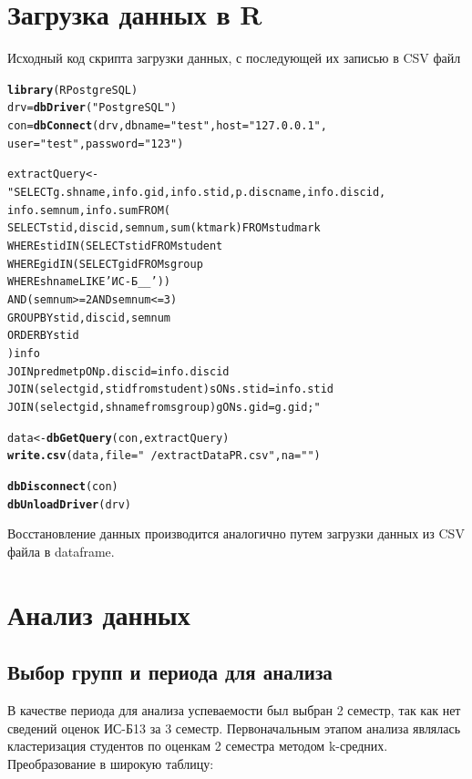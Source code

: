 \documentclass[12pt]{article}\usepackage[]{graphicx}\usepackage[]{color}
\makeatletter
\newcommand{\hlstr}[1]{\textcolor[rgb]{0.192,0.494,0.8}{#1}}%
\newcommand{\hlstd}[1]{\textcolor[rgb]{0.345,0.345,0.345}{#1}}%
\newcommand{\hlkwb}[1]{\textcolor[rgb]{0.69,0.353,0.396}{#1}}%
\newcommand{\hlkwc}[1]{\textcolor[rgb]{0.333,0.667,0.333}{#1}}%
\newcommand{\hlkwd}[1]{\textcolor[rgb]{0.737,0.353,0.396}{\textbf{#1}}}%
\newenvironment{kframe}{%
 \def\at@end@of@kframe{}%
 \ifinner\ifhmode%
  \def\at@end@of@kframe{\end{minipage}}%
  \begin{minipage}{\columnwidth}%
 \fi\fi%
 \def\FrameCommand##1{\hskip\@totalleftmargin \hskip-\fboxsep
 \colorbox{shadecolor}{##1}\hskip-\fboxsep
     \hskip-\linewidth \hskip-\@totalleftmargin \hskip\columnwidth}%
 \MakeFramed {\advance\hsize-\width
   \@totalleftmargin\z@ \linewidth\hsize
   \@setminipage}}%
 {\par\unskip\endMakeFramed%
 \at@end@of@kframe}
\newenvironment{knitrout}{}{} %
\makeatother
\begin{document}
\section{Загрузка данных в R}
Исходный код скрипта загрузки данных, с последующей их записью в CSV файл
\begin{knitrout}
\color{fgcolor}\begin{kframe}
\begin{alltt}
\hlkwd{library}\hlstd{(RPostgreSQL)}
\hlstd{drv} \hlkwb{=} \hlkwd{dbDriver}\hlstd{(}\hlstr{"PostgreSQL"}\hlstd{)}
\hlstd{con} \hlkwb{=} \hlkwd{dbConnect}\hlstd{(drv,} \hlkwc{dbname} \hlstd{=} \hlstr{"test"}\hlstd{,} \hlkwc{host} \hlstd{=} \hlstr{"127.0.0.1"}\hlstd{,}
                                \hlkwc{user} \hlstd{=} \hlstr{"test"}\hlstd{,} \hlkwc{password} \hlstd{=} \hlstr{"123"}\hlstd{)}

\hlstd{extractQuery} \hlkwb{<-}\hlstr{"SELECT g.shname, info.gid, info.stid, p.discname,info.discid,
info.semnum, info.sum FROM (  
SELECT stid, discid, semnum, sum(ktmark) FROM studmark
    WHERE stid IN (SELECT stid FROM student
        WHERE gid IN (SELECT gid FROM sgroup
            WHERE shname LIKE 'ИС-Б__')) 
    AND (semnum >=2 AND semnum <=3)
    GROUP BY stid, discid, semnum
    ORDER BY stid
) info
JOIN predmet p ON p.discid = info.discid
JOIN (select gid, stid from student) s ON s.stid=info.stid
JOIN (select gid, shname from sgroup) g ON s.gid=g.gid;"}

\hlstd{data} \hlkwb{<-} \hlkwd{dbGetQuery}\hlstd{(con, extractQuery)}
\hlkwd{write.csv}\hlstd{(data,} \hlkwc{file}\hlstd{=}\hlstr{"~/extractDataPR.csv"}\hlstd{,} \hlkwc{na}\hlstd{=}\hlstr{""}\hlstd{)}

\hlkwd{dbDisconnect}\hlstd{(con)}
\hlkwd{dbUnloadDriver}\hlstd{(drv)}
\end{alltt}
\end{kframe}
\end{knitrout}
Восстановление данных производится аналогично путем загрузки данных из CSV файла в dataframe.

\section{Анализ данных}
\subsection{Выбор групп и периода для анализа}
В качестве периода для анализа успеваемости был выбран 2 семестр, так как нет сведений оценок ИС-Б13 за 3 семестр. Первоначальным этапом анализа являлась кластеризация студентов по оценкам 2 семестра методом k-средних. Преобразование в широкую таблицу:
\end{document}
